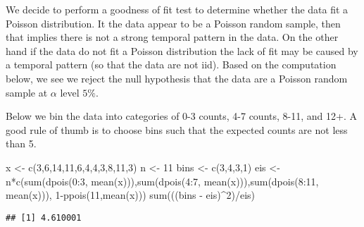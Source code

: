 \documentclass[
]{book}
\newenvironment{Shaded}{\begin{snugshade}}{\end{snugshade}}
\newcommand{\DecValTok}[1]{\textcolor[rgb]{0.00,0.00,0.81}{#1}}
\newcommand{\FunctionTok}[1]{\textcolor[rgb]{0.00,0.00,0.00}{#1}}
\newcommand{\NormalTok}[1]{#1}
\newcommand{\OtherTok}[1]{\textcolor[rgb]{0.56,0.35,0.01}{#1}}
\newcommand{\SpecialCharTok}[1]{\textcolor[rgb]{0.00,0.00,0.00}{#1}}
\begin{document}
We decide to perform a goodness of fit test to determine whether the data fit a Poisson distribution. It the data appear to be a Poisson random sample, then that implies there is not a strong temporal pattern in the data. On the other hand if the data do not fit a Poisson distribution the lack of fit may be caused by a temporal pattern (so that the data are not iid). Based on the computation below, we see we reject the null hypothesis that the data are a Poisson random sample at \(\alpha\) level \(5\%\).

Below we bin the data into categories of 0-3 counts, 4-7 counts, 8-11, and 12+. A good rule of thumb is to choose bins such that the expected counts are not less than 5.

\begin{Shaded}
\begin{Highlighting}[]
\NormalTok{x }\OtherTok{\textless{}{-}} \FunctionTok{c}\NormalTok{(}\DecValTok{3}\NormalTok{,}\DecValTok{6}\NormalTok{,}\DecValTok{14}\NormalTok{,}\DecValTok{11}\NormalTok{,}\DecValTok{6}\NormalTok{,}\DecValTok{4}\NormalTok{,}\DecValTok{4}\NormalTok{,}\DecValTok{3}\NormalTok{,}\DecValTok{8}\NormalTok{,}\DecValTok{11}\NormalTok{,}\DecValTok{3}\NormalTok{)}
\NormalTok{n }\OtherTok{\textless{}{-}} \DecValTok{11}
\NormalTok{bins }\OtherTok{\textless{}{-}} \FunctionTok{c}\NormalTok{(}\DecValTok{3}\NormalTok{,}\DecValTok{4}\NormalTok{,}\DecValTok{3}\NormalTok{,}\DecValTok{1}\NormalTok{)}
\NormalTok{eis }\OtherTok{\textless{}{-}}\NormalTok{ n}\SpecialCharTok{*}\FunctionTok{c}\NormalTok{(}\FunctionTok{sum}\NormalTok{(}\FunctionTok{dpois}\NormalTok{(}\DecValTok{0}\SpecialCharTok{:}\DecValTok{3}\NormalTok{, }\FunctionTok{mean}\NormalTok{(x))),}\FunctionTok{sum}\NormalTok{(}\FunctionTok{dpois}\NormalTok{(}\DecValTok{4}\SpecialCharTok{:}\DecValTok{7}\NormalTok{, }\FunctionTok{mean}\NormalTok{(x))),}\FunctionTok{sum}\NormalTok{(}\FunctionTok{dpois}\NormalTok{(}\DecValTok{8}\SpecialCharTok{:}\DecValTok{11}\NormalTok{, }\FunctionTok{mean}\NormalTok{(x))),   }\DecValTok{1}\SpecialCharTok{{-}}\FunctionTok{ppois}\NormalTok{(}\DecValTok{11}\NormalTok{,}\FunctionTok{mean}\NormalTok{(x)))}
\FunctionTok{sum}\NormalTok{(((bins }\SpecialCharTok{{-}}\NormalTok{ eis)}\SpecialCharTok{\^{}}\DecValTok{2}\NormalTok{)}\SpecialCharTok{/}\NormalTok{eis)}
\end{Highlighting}
\end{Shaded}

\begin{verbatim}
## [1] 4.610001
\end{verbatim}
\end{document}

